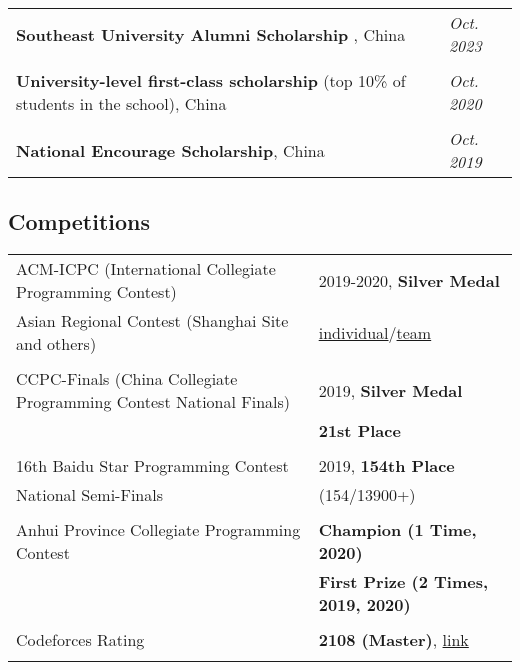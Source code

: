 \documentclass[a4paper,12pt]{article}
\begin{document}
\begin{tabularx}{\linewidth}{@{}l X@{}}

\hspace{0.2cm} \textbf{Southeast University Alumni Scholarship} , China & \hfill \normalsize{\textit{Oct. 2023}}\\
\\
\hspace{0.2cm} \textbf{University-level first-class scholarship} (top 10\% of students in the school), China & \hfill \normalsize{\textit{Oct. 2020}}\\
\\
\hspace{0.2cm} \textbf{National Encourage Scholarship}, China & \hfill \normalsize{\textit{Oct. 2019}}\\
\end{tabularx}


\subsection*{Competitions}

\begin{tabularx}{\linewidth}{@{}l X@{}}
ACM-ICPC (International Collegiate Programming Contest) & 2019-2020, \textbf{Silver Medal}\\
\normalsize{Asian Regional Contest (Shanghai Site and others)} & \href{https://zhishanq.github.io/images/ICPC_Individual.pdf}{individual}/\href{https://zhishanq.github.io/images/ICPC_Team.pdf}{team}\\
\\
CCPC-Finals (China Collegiate Programming Contest National Finals) & \normalsize{2019, \textbf{Silver Medal}}\\
& \normalsize{\textbf{21st Place}}\\
\\
16th Baidu Star Programming Contest & \normalsize{2019, \textbf{154th Place}}\\
\normalsize{National Semi-Finals}&(154/13900+)\\
\\
Anhui Province Collegiate Programming Contest & \normalsize{\textbf{Champion (1 Time, 2020)}}\\
& \normalsize{\textbf{First Prize (2 Times, 2019, 2020)}}\\
\\
Codeforces Rating & \normalsize{\textbf{2108 (Master)}, \href{https://codeforces.com/profile/QieziMin}{link}}\\
\\
\end{tabularx}




\vfill
{}
\end{document}
